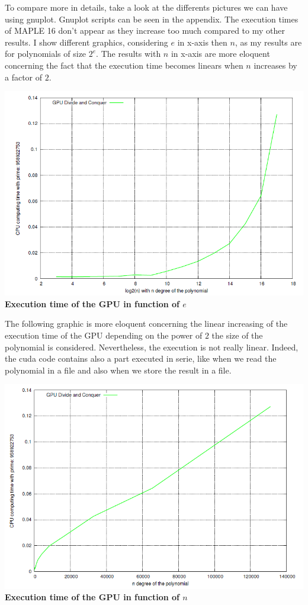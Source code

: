 To compare more in details, take a look at the differents pictures we can have using gnuplot. Gnuplot scripts can be seen in the appendix. The execution times of MAPLE 16 don't appear as they increase too much compared to my other results. I show different graphics, considering $e$ in x-axis then $n$, as my results are for polynomials of size $2^e$. The results with $n$ in x-axis are more eloquent concerning the fact that the execution time becomes linears when $n$ increases by a factor of $2$.\\

\begin{center}
\includegraphics[scale=0.8]{eps/GPUtime_e.png}
\textbf{Execution time of the GPU in function of $e$}\\
\end{center}


The following graphic is more eloquent concerning the linear increasing of the execution time of the GPU depending on the power of $2$ the size of the polynomial is considered. Nevertheless, the execution is not really linear. Indeed, the cuda code contains also a part executed in serie, like when we read the polynomial in a file and also when we store the result in a file. \\

\begin{center}
\includegraphics[scale=0.8]{eps/GPUtime_n.png}
\textbf{Execution time of the GPU in function of $n$}\\
\end{center}

